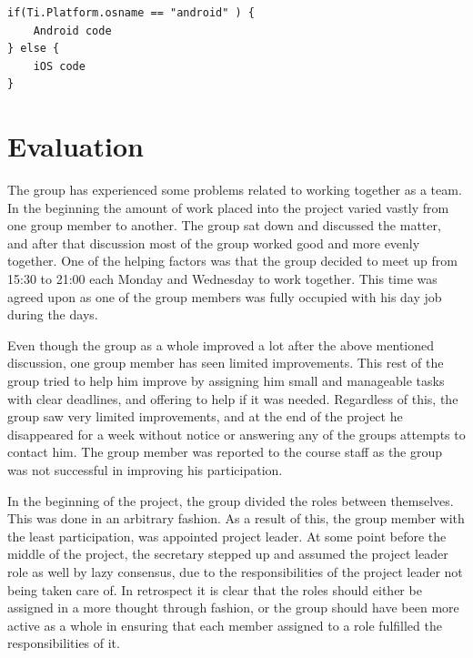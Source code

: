 \documentclass[11pt]{book}
\begin{document}
\begin{lstlisting}[frame=single]
if(Ti.Platform.osname == "android" ) {
    Android code
} else {
    iOS code
}
\end{lstlisting}
\chapter{Evaluation}
The group has experienced some problems related to working together as a team. In the beginning the amount of work placed into the project varied vastly from one group member to another. The group sat down and discussed the matter, and after that discussion most of the group worked good and more evenly together. One of the helping factors was that the group decided to meet up from 15:30 to 21:00 each Monday and Wednesday to work together. This time was agreed upon as one of the group members was fully occupied with his day job during the days.

Even though the group as a whole improved a lot after the above mentioned discussion, one group member has seen limited improvements. This rest of the group tried to help him improve by assigning him small and manageable tasks with clear deadlines, and offering to help if it was needed. Regardless of this, the group saw very limited improvements, and at the end of the project he disappeared for a week without notice or answering any of the groups attempts to contact him. The group member was reported to the course staff as the group was not successful in improving his participation.

In the beginning of the project, the group divided the roles between themselves. This was done in an arbitrary fashion. As a result of this, the group member with the least participation, was appointed project leader. At some point before the middle of the project, the secretary stepped up and assumed the project leader role as well by lazy consensus, due to the responsibilities of the project leader not being taken care of. In retrospect it is clear that the roles should either be assigned in a more thought through fashion, or the group should have been more active as a whole in ensuring that each member assigned to a role fulfilled the responsibilities of it.
\end{document}
